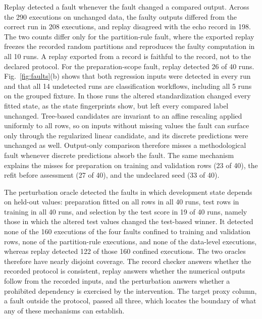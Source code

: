 \documentclass[lettersize,journal]{IEEEtran}
\begin{document}
Replay detected a fault whenever the fault changed a compared output. Across the 290 executions on unchanged data, the faulty outputs differed from the correct run in 208 executions, and replay disagreed with the echo record in 198. The two counts differ only for the partition-rule fault, where the exported replay freezes the recorded random partitions and reproduces the faulty computation in all 10 runs. A replay exported from a record is faithful to the record, not to the declared protocol. For the preparation-scope fault, replay detected 26 of 40 runs. Fig.~\ref{fig:faults}(b) shows that both regression inputs were detected in every run and that all 14 undetected runs are classification workflows, including all 5 runs on the grouped fixture. In those runs the altered standardization changed every fitted state, as the state fingerprints show, but left every compared label unchanged. Tree-based candidates are invariant to an affine rescaling applied uniformly to all rows, so on inputs without missing values the fault can surface only through the regularized linear candidate, and its discrete predictions were unchanged as well. Output-only comparison therefore misses a methodological fault whenever discrete predictions absorb the fault. The same mechanism explains the misses for preparation on training and validation rows (23 of 40), the refit before assessment (27 of 40), and the undeclared seed (33 of 40).

The perturbation oracle detected the faults in which development state depends on held-out values: preparation fitted on all rows in all 40 runs, test rows in training in all 40 runs, and selection by the test score in 19 of 40 runs, namely those in which the altered test values changed the test-based winner. It detected none of the 160 executions of the four faults confined to training and validation rows, none of the partition-rule executions, and none of the data-level executions, whereas replay detected 122 of those 160 confined executions. The two oracles therefore have nearly disjoint coverage. The record checker answers whether the recorded protocol is consistent, replay answers whether the numerical outputs follow from the recorded inputs, and the perturbation answers whether a prohibited dependency is exercised by the intervention. The target proxy column, a fault outside the protocol, passed all three, which locates the boundary of what any of these mechanisms can establish.
\end{document}
